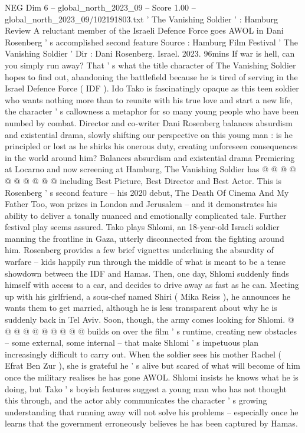 \begin{textsample}{NEG Dim 6 – global\_north\_2023\_09 – Score 1.00 – global\_north\_2023\_09/102191803.txt}  \label{ex:f6_neg_384}
' The Vanishing Soldier ' : Hamburg Review A reluctant member of the Israeli Defence Force goes AWOL in Dani Rosenberg ' s accomplished second feature Source : Hamburg Film Festival ' The Vanishing Soldier ' Dir : Dani Rosenberg.
Israel. 2023. 96mins If war is hell, can you simply run away?
That ' s what the title character of The Vanishing Soldier hopes to find out, abandoning the battlefield because he is tired of serving in the Israel Defence Force ( IDF ).
Ido Tako is fascinatingly opaque as this teen soldier who wants nothing more than to reunite with his true love and start a new life, the character ' s callowness a metaphor for so many young people who have been numbed by combat.
Director and co-writer Dani Rosenberg balances absurdism and existential drama, slowly shifting our perspective on this young man : is he principled or lost as he shirks his onerous duty, creating unforeseen consequences in the world around him?
Balances absurdism and existential drama Premiering at Locarno and now screening at Hamburg, The Vanishing Soldier has @ @ @ @ @ @ @ @ @ @ including Best Picture, Best Director and Best Actor.
This is Rosenberg ' s second feature -- his 2020 debut, The Death Of Cinema And My Father Too, won prizes in London and Jerusalem -- and it demonstrates his ability to deliver a tonally nuanced and emotionally complicated tale.
Further festival play seems assured.
Tako plays Shlomi, an 18-year-old Israeli soldier manning the frontline in Gaza, utterly disconnected from the fighting around him.
Rosenberg provides a few brief vignettes underlining the absurdity of warfare -- kids happily run through the middle of what is meant to be a tense showdown between the IDF and Hamas.
Then, one day, Shlomi suddenly finds himself with access to a car, and decides to drive away as fast as he can.
Meeting up with his girlfriend, a sous-chef named Shiri ( Mika Reiss ), he announces he wants them to get married, although he is less transparent about why he is suddenly back in Tel Aviv.
Soon, though, the army comes looking for Shlomi. @ @ @ @ @ @ @ @ @ @ builds on over the film ' s runtime, creating new obstacles -- some external, some internal -- that make Shlomi ' s impetuous plan increasingly difficult to carry out.
When the soldier sees his mother Rachel ( Efrat Ben Zur ), she is grateful he ' s alive but scared of what will become of him once the military realises he has gone AWOL.
Shlomi insists he knows what he is doing, but Tako ' s boyish features suggest a young man who has not thought this through, and the actor ably communicates the character ' s growing understanding that running away will not solve his problems -- especially once he learns that the government erroneously believes he has been captured by Hamas.

\end{textsample}
